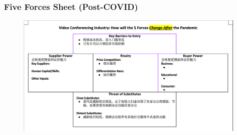 \documentclass{beamer}
\begin{document}
\begin{frame}
\frametitle{Five Forces Sheet (Post-COVID)}
\begin{figure}[h]
    \includegraphics[width=12cm]{pics/after.png}
\end{figure}
\end{frame}
\end{document}
